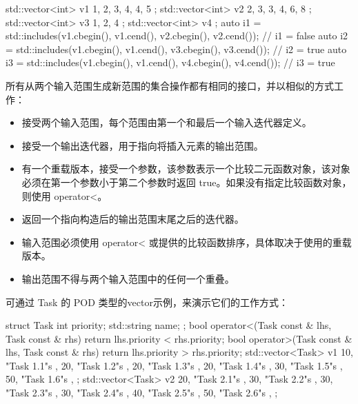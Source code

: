 \begin{itemize}
\begin{cpp}
std::vector<int> v1{ 1, 2, 3, 4, 4, 5 };
std::vector<int> v2{ 2, 3, 3, 4, 6, 8 };
std::vector<int> v3{ 1, 2, 4 };
std::vector<int> v4{ };
auto i1 = std::includes(v1.cbegin(), v1.cend(),
                        v2.cbegin(), v2.cend()); // i1 = false
auto i2 = std::includes(v1.cbegin(), v1.cend(),
                        v3.cbegin(), v3.cend()); // i2 = true
auto i3 = std::includes(v1.cbegin(), v1.cend(),
                        v4.cbegin(), v4.cend()); // i3 = true
\end{cpp}
\end{itemize}


所有从两个输入范围生成新范围的集合操作都有相同的接口，并以相似的方式工作：

\begin{itemize}
\item
接受两个输入范围，每个范围由第一个和最后一个输入迭代器定义。

\item
接受一个输出迭代器，用于指向将插入元素的输出范围。

\item
有一个重载版本，接受一个参数，该参数表示一个比较二元函数对象，该对象必须在第一个参数小于第二个参数时返回 true。如果没有指定比较函数对象，则使用 operator<。

\item
返回一个指向构造后的输出范围末尾之后的迭代器。

\item
输入范围必须使用 operator< 或提供的比较函数排序，具体取决于使用的重载版本。

\item
输出范围不得与两个输入范围中的任何一个重叠。
\end{itemize}

可通过 Task 的 POD 类型的vector示例，来演示它们的工作方式：

\begin{cpp}
struct Task
{
    int         priority;
    std::string name;
};
bool operator<(Task const & lhs, Task const & rhs) {
    return lhs.priority < rhs.priority;
}
bool operator>(Task const & lhs, Task const & rhs) {
    return lhs.priority > rhs.priority;
}
std::vector<Task> v1{
    { 10, "Task 1.1"s },
    { 20, "Task 1.2"s },
    { 20, "Task 1.3"s },
    { 20, "Task 1.4"s },
    { 30, "Task 1.5"s },
    { 50, "Task 1.6"s },
};
std::vector<Task> v2{
    { 20, "Task 2.1"s },
    { 30, "Task 2.2"s },
    { 30, "Task 2.3"s },
    { 30, "Task 2.4"s },
    { 40, "Task 2.5"s },
    { 50, "Task 2.6"s },
};
\end{cpp}

